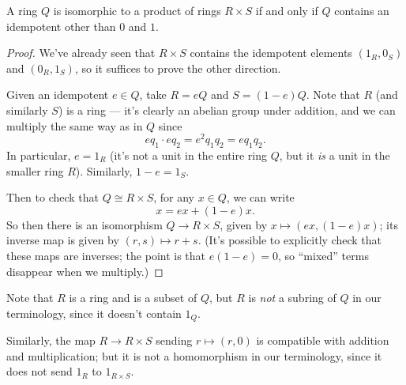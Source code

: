 \begin{proposition}
A ring $Q$ is isomorphic to a product of rings $R \times S$ if and only if $Q$ contains an idempotent other than $0$ and $1$. 
\end{proposition}

\begin{proof}
We've already seen that $R \times S$ contains the idempotent elements $(1_R, 0_S)$ and $(0_R, 1_S)$, so it suffices to prove the other direction.  

Given an idempotent $e \in Q$, take $R = eQ$ and $S = (1 - e)Q$. Note that $R$ (and similarly $S$) is a ring --- it's clearly an abelian group under addition, and we can multiply the same way as in $Q$ since \[eq_1\cdot eq_2 = e^2q_1q_2 = eq_1q_2.\] In particular, $e = 1_R$ (it's not a unit in the entire ring $Q$, but it \emph{is} a unit in the smaller ring $R$). Similarly, $1 - e = 1_S$. 

Then to check that $Q \cong R \times S$, for any $x \in Q$, we can write \[x = ex + (1 - e)x.\] So then there is an isomorphism $Q \to R \times S$, given by $x \mapsto (ex, (1 - e)x)$; its inverse map is given by $(r, s) \mapsto r + s$. (It's possible to explicitly check that these maps are inverses; the point is that $e(1 - e) = 0$, so ``mixed'' terms disappear when we multiply.)
\end{proof}

\begin{note}
    Note that $R$ is a ring and is a subset of $Q$, but $R$ is \emph{not} a subring of $Q$ in our terminology, since it doesn't contain $1_Q$. 
    
    Similarly, the map $R \to R \times S$ sending $r \mapsto (r, 0)$ is compatible with addition and multiplication; but it is not a homomorphism in our terminology, since it does not send $1_R$ to $1_{R \times S}$. 
\end{note}




